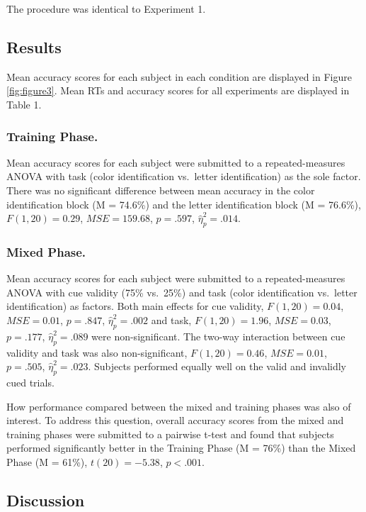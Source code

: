 \documentclass[english,,man,floatsintext]{apa6}
\begin{document}
The procedure was identical to Experiment 1.

\subsection{Results}\label{results-1}

Mean accuracy scores for each subject in each condition are displayed in
Figure \ref{fig:figure3}. Mean RTs and accuracy scores for all
experiments are displayed in Table 1.

\subsubsection{Training Phase.}\label{training-phase.}

Mean accuracy scores for each subject were submitted to a
repeated-measures ANOVA with task (color identification vs.~letter
identification) as the sole factor. There was no significant difference
between mean accuracy in the color identification block (M = 74.6\%) and
the letter identification block (M = 76.6\%), \(F(1, 20) = 0.29\),
\(\mathit{MSE} = 159.68\), \(p = .597\), \(\hat{\eta}^2_p = .014\).

\subsubsection{Mixed Phase.}\label{mixed-phase.}

Mean accuracy scores for each subject were submitted to a
repeated-measures ANOVA with cue validity (75\% vs.~25\%) and task
(color identification vs.~letter identification) as factors. Both main
effects for cue validity, \(F(1, 20) = 0.04\), \(\mathit{MSE} = 0.01\),
\(p = .847\), \(\hat{\eta}^2_p = .002\) and task, \(F(1, 20) = 1.96\),
\(\mathit{MSE} = 0.03\), \(p = .177\), \(\hat{\eta}^2_p = .089\) were
non-significant. The two-way interaction between cue validity and task
was also non-significant, \(F(1, 20) = 0.46\), \(\mathit{MSE} = 0.01\),
\(p = .505\), \(\hat{\eta}^2_p = .023\). Subjects performed equally well
on the valid and invalidly cued trials.

How performance compared between the mixed and training phases was also
of interest. To address this question, overall accuracy scores from the
mixed and training phases were submitted to a pairwise t-test and found
that subjects performed significantly better in the Training Phase (M =
76\%) than the Mixed Phase (M = 61\%), \(t(20) = -5.38\), \(p < .001\).

\subsection{Discussion}\label{discussion-1}
\end{document}
